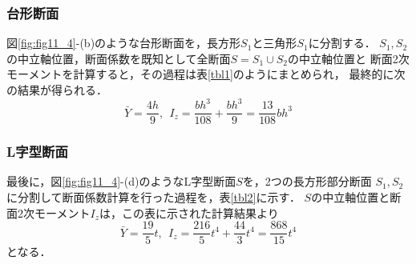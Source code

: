 \documentclass[10pt,a4j]{jarticle}
\begin{document}
\subsubsection{台形断面}
図\ref{fig:fig11_4}-(b)のような台形断面を，長方形$S_1$と三角形$S_1$に分割する．
$S_1,S_2$の中立軸位置，断面係数を既知として全断面$S=S_1 \cup S_2$の中立軸位置と
断面2次モーメントを計算すると，その過程は表\ref{tbl1}のようにまとめられ，
最終的に次の結果が得られる．
\begin{equation}
	\bar{Y}=\frac{4h}{9}, \ \ 
	I_z=\frac{bh^3}{108}+\frac{bh^3}{9}=\frac{13}{108}bh^3
\end{equation}
\subsubsection{L字型断面}
最後に，図\ref{fig:fig11_4}-(d)のようなL字型断面$S$を，2つの長方形部分断面
$S_1,S_2$に分割して断面係数計算を行った過程を，表\ref{tbl2}に示す．
$S$の中立軸位置と断面2次モーメント$I_z$は，この表に示された計算結果より
\begin{equation}
	\bar{Y}=\frac{19}{5}t, \ \ 
	I_z=\frac{216}{5}t^4+\frac{44}{3}t^4 = \frac{868}{15}t^4
\end{equation}
となる．
\end{document}
